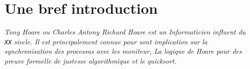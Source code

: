 \documentclass[French,Hoar.tex]{subfiles}
\begin{document}
  \section{Une bref introduction}
  \em{Tony Hoare} ou \em{Charles Antony Richard Hoare} est un Informaticien influent du \texttt{XX} siecle.
  Il est principalement connue pour sont implication sur la synchronisation des processus avec les moniteur,
  La logique de Hoare pour des preuve formelle de justesse algorithmique et le quicksort.
\end{document}
